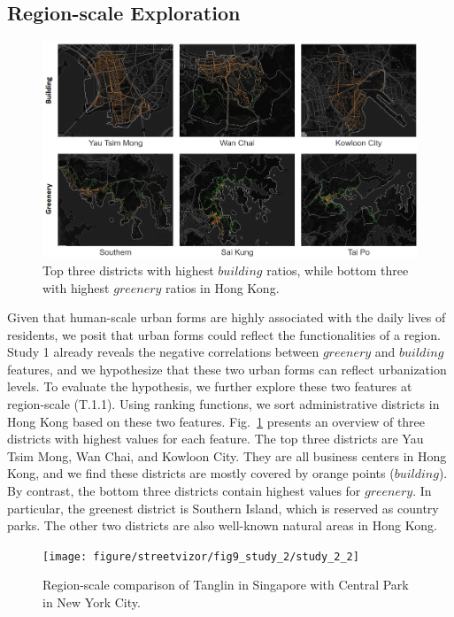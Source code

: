 \subsection{Region-scale Exploration}
\begin{figure}[t]
	\centering
	\includegraphics[width=0.98\columnwidth]{figure/streetvizor/fig9_study_2/region-functionality.png}
	\vspace{-5mm}
	\caption{Top three districts with highest $building$ ratios, while bottom three with highest $greenery$ ratios in Hong Kong.}
	\label{fig:s1_region-funcitonality}
	\vspace{-4mm}
\end{figure}
Given that human-scale urban forms are highly associated with the daily lives of residents, we posit that urban forms could reflect the functionalities of a region.
Study 1 already reveals the negative correlations between $greenery$ and $building$ features, and we hypothesize that these two urban forms can reflect urbanization levels.
To evaluate the hypothesis, we further explore these two features at region-scale (T.1.1).
Using ranking functions, we sort administrative districts in Hong Kong based on these two features.
Fig.~\ref{fig:s1_region-funcitonality} presents an overview of three districts with highest values for each feature.
The top three districts are Yau Tsim Mong, Wan Chai, and Kowloon City.
They are all business centers in Hong Kong, and we find these districts are mostly covered by orange points ($building$). 
By contrast, the bottom three districts contain highest values for $greenery$.
In particular, the greenest district is Southern Island, which is reserved as country parks.
The other two districts are also well-known natural areas in Hong Kong.
 
\begin{figure}[t]
	\centering
	\texttt{[image: figure/streetvizor/fig9\_study\_2/study\_2\_2]}
	\vspace{-7mm}
	\caption{Region-scale comparison of Tanglin in Singapore with Central Park in New York City.}
	\label{fig:c1_center-park-tanglin}
	\vspace{-1mm}
\end{figure}

